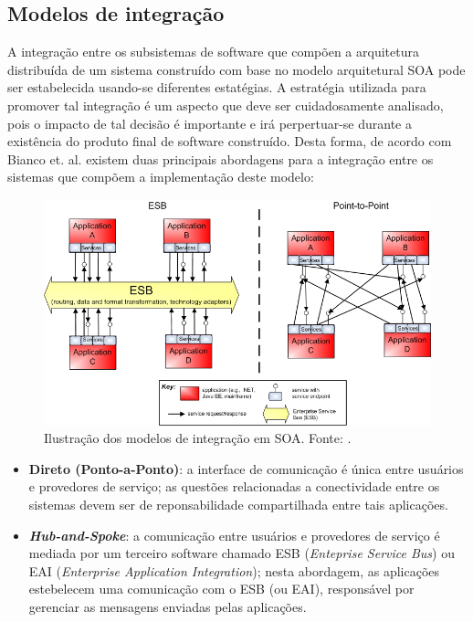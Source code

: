 \subsection{Modelos de integração}
A integração entre os subsistemas de software que compõen a arquitetura distribuída de um sistema construído com base no modelo arquitetural SOA pode ser estabelecida usando-se diferentes estatégias. A estratégia utilizada para promover tal integração é um aspecto que deve ser cuidadosamente analisado, pois o impacto de tal decisão é importante e irá perpertuar-se durante a existência do produto final de software construído. Desta forma, de acordo com Bianco et. al. \cite{Bianco2007} existem duas principais abordagens para a integração entre os sistemas que compõem a implementação deste modelo:

\begin{figure}[htb]
\centering
\includegraphics[scale=0.7]{figuras/modelos_integracao_soa.PNG}
\caption{Ilustração dos modelos de integração em SOA. Fonte: \cite{Bianco2007}.}
\label{modelos_integracao_soa}
\end{figure}

\begin{itemize}
\item \textbf{Direto (Ponto-a-Ponto)}: a interface de comunicação é única entre usuários e provedores de serviço; as questões relacionadas a conectividade entre os sistemas devem ser de reponsabilidade compartilhada entre tais aplicações.
\item \textbf{\textit{Hub-and-Spoke}}: a comunicação entre usuários e provedores de serviço é mediada por um terceiro software chamado ESB (\textit{Enteprise Service Bus}) ou EAI (\textit{Enterprise Application Integration}); nesta abordagem, as aplicações estebelecem uma comunicação com o ESB (ou EAI), responsável por gerenciar as mensagens enviadas pelas aplicações.
\end{itemize}

